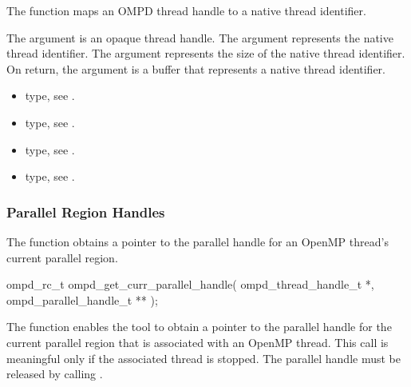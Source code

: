 \descr
The  function maps an OMPD thread handle to a 
native thread identifier.

\argdesc
The  argument is an opaque thread handle. The  
argument represents the native thread identifier. The 
argument represents the size of the native thread identifier. On return, the 
 argument is a buffer that represents a native thread identifier.

\crossreferences
\begin{itemize}
\item {} type, see .

\item {} type, see .

\item {} type, 
see .

\item {} type, see .
\end{itemize}



\subsubsection{Parallel Region Handles}

\label{subsubsubsec:ompd_get_curr_parallel_handle}
\summary
The   function obtains a pointer 
to the parallel handle for an OpenMP thread's current parallel region.

\format
\begin{cspecific}
\begin{ompSyntax}
ompd_rc_t ompd_get_curr_parallel_handle(
  ompd_thread_handle_t *,
  ompd_parallel_handle_t **
);
\end{ompSyntax}
\end{cspecific}

\descr
The   function enables the tool 
to obtain a pointer to the parallel handle for the current parallel region 
that is associated with an OpenMP thread. This call is meaningful only if 
the associated thread is stopped. The parallel handle must be released by 
calling .


